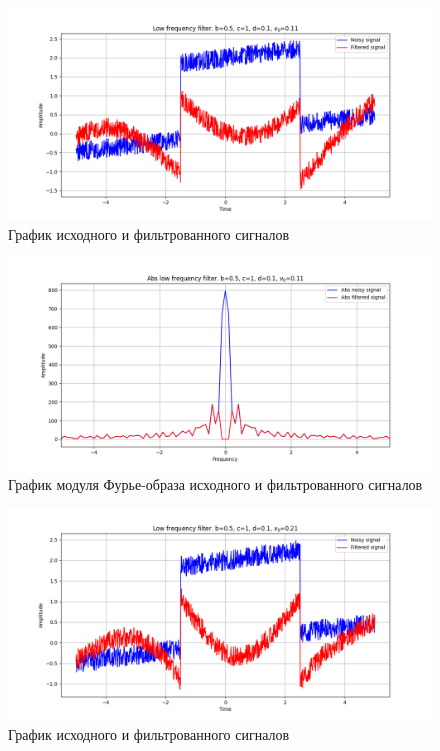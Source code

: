 \documentclass[a4paper, 12pt]{article}
\begin{document}
    \begin{figure}[!htb]
        \centering
        \includegraphics[scale=0.485]{1_u_flt_u_nolow.png}
        \captionsetup{skip=0pt}
        \caption{График исходного и фильтрованного сигналов}
        \label{fig:fig27}
    \end{figure}
    \begin{figure}[!htb]
        \centering
        \includegraphics[scale=0.485]{1_abs_u_U_nolow.png}
        \captionsetup{skip=0pt}
        \caption{График модуля Фурье-образа исходного и фильтрованного сигналов}
        \label{fig:fig28}
    \end{figure}
    \begin{figure}[!htb]
        \centering
        \includegraphics[scale=0.485]{2_u_flt_u_nolow.png}
        \captionsetup{skip=0pt}
        \caption{График исходного и фильтрованного сигналов}
        \label{fig:fig29}
    \end{figure}
\end{document}
